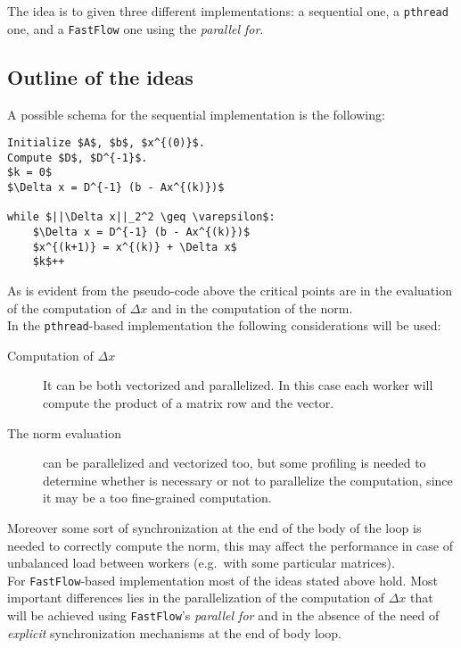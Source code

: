 The idea is to given three different implementations: a sequential one, a \lstinline|pthread| one, and a \lstinline|FastFlow| one using the \emph{parallel for}.

\subsection{Outline of the ideas}
A possible schema for the sequential implementation is the following:
\begin{lstlisting}
Initialize $A$, $b$, $x^{(0)}$.
Compute $D$, $D^{-1}$.
$k = 0$
$\Delta x = D^{-1} (b - Ax^{(k)})$

while $||\Delta x||_2^2 \geq \varepsilon$:
	$\Delta x = D^{-1} (b - Ax^{(k)})$
	$x^{(k+1)} = x^{(k)} + \Delta x$
	$k$++
\end{lstlisting}
\noindent
As is evident from the pseudo-code above the critical points are in the evaluation of the computation of $\Delta x$ and in the computation of the norm.\\
In the \lstinline|pthread|-based implementation the following considerations will be used:
\begin{description}
	\item[Computation of $\Delta x$] It can be both vectorized and parallelized.
	In this case each worker will compute the product of a matrix row and the vector.
	\item[The norm evaluation] can be parallelized and vectorized too, but some profiling is needed to determine whether is necessary or not to parallelize the computation, since it may be a too fine-grained computation.
\end{description}
Moreover some sort of synchronization at the end of the body of the loop is needed to correctly compute the norm, this may affect the performance in case of unbalanced load between workers (e.g.\ with some particular matrices).\\
For \lstinline|FastFlow|-based implementation most of the ideas stated above hold.
Most important differences lies in the parallelization of the computation of $\Delta x$ that will be achieved using \lstinline|FastFlow|'s \emph{parallel for} and in the 
absence of the need of \emph{explicit} synchronization mechanisms at the end of body loop. 
